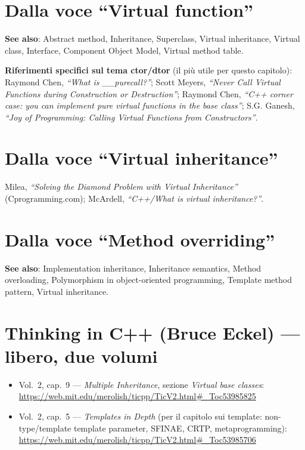 \documentclass{report}
\begin{document}
\section{Dalla voce ``Virtual function''}

\textbf{See also}: Abstract method, Inheritance, Superclass, Virtual
inheritance, Virtual class, Interface, Component Object Model, Virtual
method table.

\textbf{Riferimenti specifici sul tema ctor/dtor} (il più utile per
questo capitolo): Raymond Chen, \emph{``What is \_\_purecall?''}; Scott
Meyers, \emph{``Never Call Virtual Functions during Construction or
Destruction''}; Raymond Chen, \emph{``C++ corner case: you can implement
pure virtual functions in the base class''}; S.G. Ganesh, \emph{``Joy of
Programming: Calling Virtual Functions from Constructors''}.

\section{Dalla voce ``Virtual inheritance''}

Milea, \emph{``Solving the Diamond Problem with Virtual Inheritance''}
(Cprogramming.com); McArdell, \emph{``C++/What is virtual
inheritance?''}.

\section{Dalla voce ``Method overriding''}

\textbf{See also}: Implementation inheritance, Inheritance semantics,
Method overloading, Polymorphism in object-oriented programming,
Template method pattern, Virtual inheritance.

\section{Thinking in C++ (Bruce Eckel) --- libero, due volumi}

\begin{itemize}
    \item Vol.~2, cap.~9 --- \emph{Multiple Inheritance}, sezione
          \emph{Virtual base classes}: \url{https://web.mit.edu/merolish/ticpp/TicV2.html\#_Toc53985825}
    \item Vol.~2, cap.~5 --- \emph{Templates in Depth} (per il capitolo
          sui template: non-type/template template parameter, SFINAE,
          CRTP, metaprogramming): \url{https://web.mit.edu/merolish/ticpp/TicV2.html\#_Toc53985706}
\end{itemize}
\end{document}
